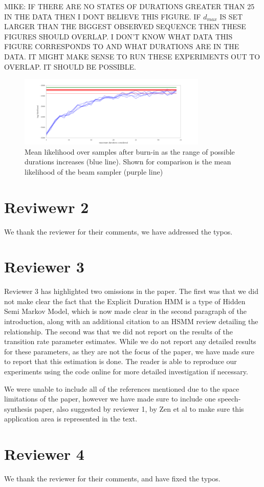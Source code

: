 \documentclass{article}
\begin{document}
MIKE: IF THERE ARE NO STATES OF DURATIONS GREATER THAN 25 IN THE DATA THEN I DONT BELIEVE THIS FIGURE.  IF $d_{max}$ IS SET LARGER THAN THE BIGGEST OBSERVED SEQUENCE THEN THESE FIGURES SHOULD OVERLAP.  I DON'T KNOW WHAT DATA THIS FIGURE CORRESPONDS TO AND WHAT DURATIONS ARE IN THE DATA.  IT MIGHT MAKE SENSE TO RUN THESE EXPERIMENTS OUT TO OVERLAP.  IT SHOULD BE POSSIBLE.  

\begin{figure}
	\includegraphics[width=0.8\textwidth]{../pic/likelihood_over_dmax.pdf}
	\caption{Mean likelihood over samples after burn-in as the range of possible durations increases (blue line). Shown for comparison is the mean likelihood of the beam sampler (purple line)}
\end{figure}


\section*{Reviwewr 2}

We thank the reviewer for their comments, we have addressed the typos. 

\section*{Reviewer 3}

Reviewer 3 has highlighted two omissions in the paper. The first was that we did not make clear the fact that the Explicit Duration HMM is a type of Hidden Semi Markov Model, which is now made clear in the second paragraph of the introduction, along with an additional citation to an HSMM review detailing the relationship. The second was that we did not report on the results of the transition rate parameter estimates. While we do not report any detailed results for these parameters, as they are not the focus of the paper, we have made sure to report that this estimation is done. The reader is able to reproduce our experiments using the code online for more detailed investigation if necessary. 

We were unable to include all of the references mentioned due to the space limitations of the paper, however we have made sure to include one speech-synthesis paper, also suggested by reviewer 1, by Zen et al to make sure this application area is represented in the text. 

\section*{Reviewer 4}

We thank the reviewer for their comments, and have fixed the typos. 
\end{document}
